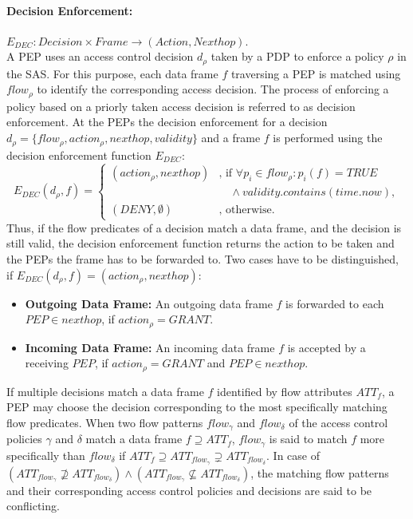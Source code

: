 \paragraph{Decision Enforcement:} $E_{DEC}: Decision \times Frame \rightarrow (Action, Nexthop)$.\\
A PEP uses an access control decision $d_{\rho}$ taken by a PDP to enforce a policy $\rho$ in the SAS.
For this purpose, each data frame $f$ traversing a PEP is matched using $flow_\rho$ to identify the corresponding access decision.
The process of enforcing a policy based on a priorly taken access decision is referred to as decision enforcement.
At the PEPs the decision enforcement for a decision $d_{\rho} = \{flow_\rho, action_\rho, nexthop, validity\}$ and a frame $f$ is performed using the decision enforcement function $E_{DEC}$:
\[
    E_{DEC}(d_{\rho}, f) =
    \begin{cases}
        (action_\rho, nexthop) & \text{, if } \forall p_i \in flow_{\rho}: p_i(f) = TRUE\\
        & \quad \land validity.contains(time.now),\\
        (DENY, \emptyset) & \text{, otherwise.}
    \end{cases}
\]
Thus, if the flow predicates of a decision match a data frame, and the decision is still valid, the decision enforcement function returns the action to be taken and the PEPs the frame has to be forwarded to.
Two cases have to be distinguished, if $E_{DEC}(d_{\rho}, f) = (action_\rho, nexthop)$:
\begin{itemize}
    \item \textbf{Outgoing Data Frame:} An outgoing data frame $f$ is forwarded to each $PEP \in nexthop$, if $action_\rho = GRANT$.
    \item \textbf{Incoming Data Frame:} An incoming data frame $f$ is accepted by a receiving $PEP$, if $action_\rho = GRANT$ and $PEP \in nexthop$.
\end{itemize}
If multiple decisions match a data frame $f$ identified by flow attributes $ATT_{f}$, a PEP may choose the decision corresponding to the most specifically matching flow predicates.
When two flow patterns $flow_\gamma$ and $flow_\delta$ of the access control policies $\gamma$ and $\delta$ match a data frame $f \supseteq ATT_{f}$, $flow_\gamma$ is said to match $f$ more specifically than $flow_\delta$ if $ATT_{f} \supseteq ATT_{flow_{\gamma}} \supsetneq ATT_{flow_{\delta}}$.
In case of $(ATT_{flow_{\gamma}} \not \supseteq ATT_{flow_{\delta}}) \land (ATT_{flow_{\gamma}} \not \subseteq ATT_{flow_{\delta}})$, the matching flow patterns and their corresponding access control policies and decisions are said to be conflicting.
